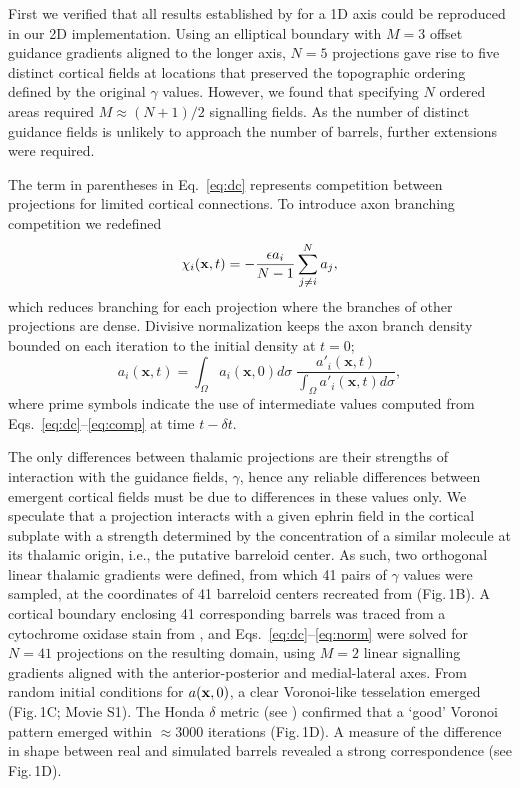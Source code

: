 \documentclass[9pt,twocolumn,twoside,lineno]{pnas-new}
\begin{document}
First we verified that all results established by \cite{karbowski_model_2004}
for a 1D axis could be reproduced in our 2D implementation. Using an
elliptical boundary with $M=3$ offset guidance gradients aligned to the longer
axis, $N=5$ projections gave rise to five distinct cortical fields at
locations that preserved the topographic ordering defined by the original
$\gamma$ values. However, we found that specifying $N$ ordered areas required
$M\approx (N+1)/2$ signalling fields. As the number of distinct guidance
fields is unlikely to approach the number of barrels, further extensions were
required.

The term in parentheses in Eq.~\ref{eq:dc} represents competition between
projections for limited cortical connections. To introduce axon branching
competition we redefined
%
\begin{equation} \label{eq:comp}
\chi_i(\mathbf{x}, t) = - \frac{\epsilon  a_i}{N-1} \sum_{j \ne i}^{N} a_{j},
\end{equation}
%
which reduces branching for each projection where the branches of other
projections are dense. Divisive normalization keeps the axon branch density
bounded on each iteration to the initial density at $t=0$;
%
\begin{equation} \label{eq:norm}
  a_i(\mathbf{x}, t) = \int_\Omega  a_i(\mathbf{x}, 0) d\sigma \; \frac {a'_i(\mathbf{x}, t)} {\int_\Omega
  a'_i(\mathbf{x}, t) d\sigma},
\end{equation}
%
where prime symbols indicate the use of intermediate values computed from Eqs.~\ref{eq:dc}--\ref{eq:comp} at time $t-{\delta}t$.

The only differences between thalamic projections are their strengths of
interaction with the guidance fields, $\gamma$, hence any reliable differences
between emergent cortical fields must be due to differences in these values
only. We speculate that a projection interacts with a given ephrin field in
the cortical subplate with a strength determined by the concentration of a
similar molecule at its thalamic origin, i.e., the putative barreloid
center. As such, two orthogonal linear thalamic gradients were defined, from
which 41 pairs of $\gamma$ values were sampled, at the coordinates of 41
barreloid centers recreated from \cite{haidarliu_size_2001} (Fig.\,1B).
%
A cortical boundary enclosing 41 corresponding barrels was traced from a
cytochrome oxidase stain from \cite{zheng_signal_2001}, and
Eqs.~\ref{eq:dc}--\ref{eq:norm} were solved for $N=41$ projections on the
resulting domain, using $M=2$ linear signalling gradients aligned with the
anterior-posterior and medial-lateral axes. From random initial conditions for
$a({\bf x},0)$, a clear Voronoi-like tesselation emerged (Fig.\,1C; Movie
S1). The Honda $\delta$ metric (see \cite{senft_mouse_1991}) confirmed that a
`good' Voronoi pattern emerged within $\approx 3000$ iterations (Fig.\,1D). A
measure of the difference in shape between real and simulated barrels revealed
a strong correspondence (see Fig.\,1D).
\end{document}
